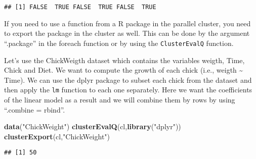 \documentclass[]{article}
\newenvironment{Shaded}{\begin{snugshade}}{\end{snugshade}}
\newcommand{\KeywordTok}[1]{\textcolor[rgb]{0.13,0.29,0.53}{\textbf{#1}}}
\newcommand{\DataTypeTok}[1]{\textcolor[rgb]{0.13,0.29,0.53}{#1}}
\newcommand{\DecValTok}[1]{\textcolor[rgb]{0.00,0.00,0.81}{#1}}
\newcommand{\StringTok}[1]{\textcolor[rgb]{0.31,0.60,0.02}{#1}}
\newcommand{\CommentTok}[1]{\textcolor[rgb]{0.56,0.35,0.01}{\textit{#1}}}
\newcommand{\OperatorTok}[1]{\textcolor[rgb]{0.81,0.36,0.00}{\textbf{#1}}}
\newcommand{\NormalTok}[1]{#1}
\begin{document}
\begin{verbatim}
## [1] FALSE  TRUE FALSE  TRUE FALSE  TRUE
\end{verbatim}

If you need to use a function from a R package in the parallel cluster,
you need to export the package in the cluster as well. This can be done
by the argument ``.package'' in the foreach function or by using the
\texttt{ClusterEvalQ} function.

Let's use the ChickWeigth dataset which contains the variables weigth,
Time, Chick and Diet. We want to compute the growth of each chick (i.e.,
weigth \textasciitilde{} Time). We can use the dplyr package to subset
each chick from the dataset and then apply the \texttt{lm} function to
each one separately. Here we want the coefficients of the linear model
as a result and we will combine them by rows by using ``.combine =
rbind''.

\begin{Shaded}
\begin{Highlighting}[]
\KeywordTok{data}\NormalTok{(}\StringTok{"ChickWeight"}\NormalTok{)}
\KeywordTok{clusterEvalQ}\NormalTok{(cl,}\KeywordTok{library}\NormalTok{(}\StringTok{"dplyr"}\NormalTok{))}
\KeywordTok{clusterExport}\NormalTok{(cl,}\StringTok{"ChickWeight"}\NormalTok{)}
\end{Highlighting}
\end{Shaded}

\begin{Shaded}
\end{Shaded}

\begin{verbatim}
## [1] 50
\end{verbatim}

\begin{Shaded}
\end{Shaded}
\end{document}
